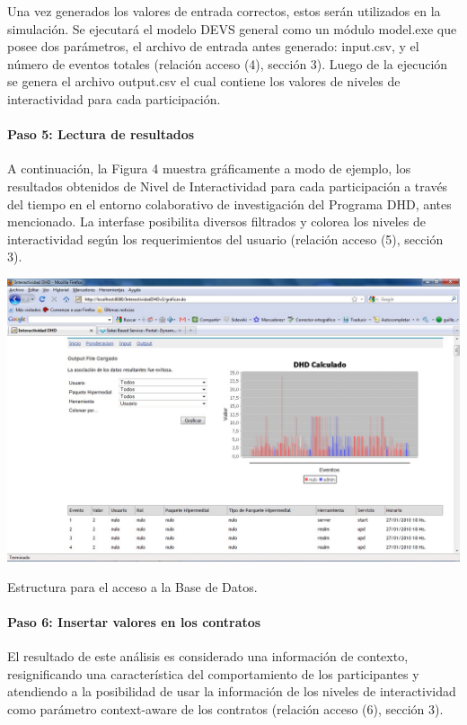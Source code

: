 Una vez generados los valores de entrada correctos, estos serán utilizados en la
simulación. Se ejecutará el modelo DEVS general como un módulo model.exe que
posee dos parámetros, el archivo de entrada antes generado: input.csv, y el
número de eventos totales (relación acceso (4), sección 3). Luego de la
ejecución se genera el archivo output.csv el cual contiene los valores de
niveles de interactividad para cada participación.

\paragraph{Paso 5: Lectura de resultados}


A continuación, la Figura 4 muestra gráficamente a modo de ejemplo, los
resultados obtenidos de Nivel de Interactividad para cada participación a través
del tiempo en el entorno colaborativo de investigación del Programa DHD, antes
mencionado. La interfase posibilita diversos filtrados y colorea los niveles de
interactividad según los requerimientos del usuario (relación acceso (5),
sección 3).


\begin{center}
 \includegraphics[width=5 in,totalheight=4 in] {Ch9/f15}
\end{center}
\caption{Estructura para el acceso a la Base de Datos.}

\paragraph{Paso 6: Insertar valores en los contratos}


El resultado de este análisis es considerado una información de contexto,
resignificando una característica del comportamiento de los participantes y
atendiendo a la posibilidad de usar la información de los niveles de
interactividad como parámetro context-aware de los contratos (relación acceso
(6), sección 3).

